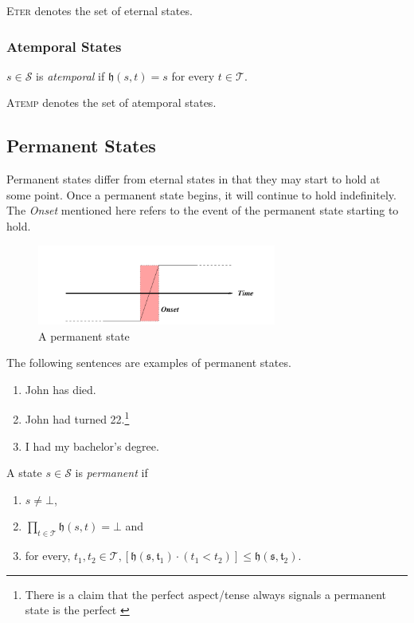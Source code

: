 \textsc{Eter} denotes the set of eternal states.

\subsubsection{Atemporal States}
\begin{defn}
	$s \in \mathcal{S}$ is \textit{atemporal} if $\mathfrak{h}(s, t) = s$ for every $t \in \mathcal{T}$.
\end{defn}
\textsc{Atemp} denotes the set of atemporal states.
\subsection{Permanent States}
Permanent states differ from eternal states in that they may start to hold at some point.
Once a permanent state begins, it will continue to hold indefinitely. The \textit{Onset} mentioned here refers to the event of the permanent state starting to hold.


\begin{figure}[H]
	\centering
	\includegraphics[width=0.7\textwidth]{images/permanent-states.png}
	\caption{A permanent state}
	\label{fig:permanent}
\end{figure}

The following sentences are examples of permanent states.


\begin{enumerate}
	\item John has died.
	\item John had turned 22.\footnote{There is a claim that the perfect aspect/tense always signals a permanent state is the perfect \cite{termeulen1997representing}}
	\item I had my bachelor's degree.
\end{enumerate}

\begin{defn}
	A state $s \in \mathcal{S}$ is \textit{permanent} if
	\begin{enumerate}
		\item $s \neq \bot$,
		\item $\displaystyle \prod_{t \in \mathcal{T}} \mathfrak{h}(s, t) = \bot$ and
		\item for every, $t_1, t_2 \in \mathcal{T}, [\mathfrak{h(s, t_1)} \cdot (t_1 < t_2)] \leq \mathfrak{h(s, t_2)}$.
	\end{enumerate}
\end{defn}

